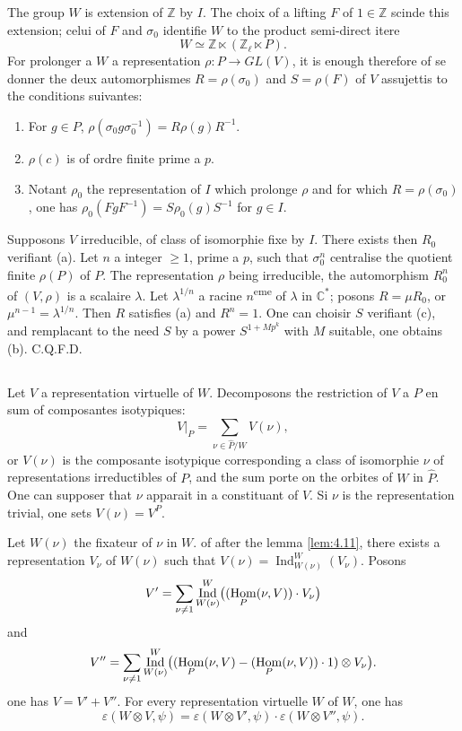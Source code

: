 \documentclass[12pt,a4paper]{article}
\theoremstyle{plain}
\theoremstyle{definition}
\theoremstyle{remark}
\DeclareMathOperator{\Ind}{Ind}
\DeclareMathOperator{\Hom}{Hom}
\newcommand{\bZ}{\mathbb{Z}}
\newcommand{\bC}{\mathbb{C}}
\let\dim\relax\let\det\relax
\providecommand{\Hom}{\operatorname{Hom}}
\begin{document}
The group $W$ is extension of $\bZ$ by $I$. The choix of a lifting $F$ of $1 \in \bZ$ scinde this extension; celui of $F$ and $\sigma_0$ identifie $W$ to the product semi-direct itere
\[
W \simeq \bZ \ltimes (\bZ_\ell \ltimes P).
\]
For prolonger a $W$ a representation $\rho: P \to GL(V)$, it is enough therefore of se donner the deux automorphismes $R = \rho(\sigma_0)$ and $S = \rho(F)$ of $V$ assujettis to the conditions suivantes:
\begin{enumerate}[label=(\alph*)]
\item For $g \in P$, $\rho(\sigma_0 g \sigma_0^{-1}) = R \rho(g) R^{-1}$.
\item $\rho(c)$ is of ordre finite prime a $p$.
\item Notant $\rho_0$ the representation of $I$ which prolonge $\rho$ and for which $R = \rho(\sigma_0)$, one has $\rho_0(F g F^{-1}) = S \rho_0(g) S^{-1}$ for $g \in I$.
\end{enumerate}

Supposons $V$ irreducible, of class of isomorphie fixe by $I$. There exists then $R_0$ verifiant (a). Let $n$ a integer $\geq 1$, prime a $p$, such that $\sigma_0^n$ centralise the quotient finite $\rho(P)$ of $P$. The representation $\rho$ being irreducible, the automorphism $R_0^n$ of $(V, \rho)$ is a scalaire $\lambda$. Let $\lambda^{1/n}$ a racine $n$\textsuperscript{eme} of $\lambda$ in $\bC^*$; posons $R = \mu R_0$, or $\mu^{n-1} = \lambda^{1/n}$. Then $R$ satisfies (a) and $R^n = 1$. One can choisir $S$ verifiant (c), and remplacant to the need $S$ by a power $S^{1 + Mp^k}$ with $M$ suitable, one obtains (b). C.Q.F.D.


\subsection{}
\label{sec:4.13}

Let $V$ a representation virtuelle of $W$. Decomposons the restriction of $V$ a $P$ en sum of composantes isotypiques:
\[
V|_P = \sum_{\nu \in \hat{P}/W} V(\nu),
\]
or $V(\nu)$ is the composante isotypique corresponding a class of isomorphie $\nu$ of representations irreductibles of $P$, and the sum porte on the orbites of $W$ in $\hat{P}$. One can supposer that $\nu$ apparait in a constituant of $V$. Si $\nu$ is the representation trivial, one sets $V(\nu) = V^P$.

Let $W(\nu)$ the fixateur of $\nu$ in $W$. of after the lemma \ref{lem:4.11}, there exists a representation $V_\nu$ of $W(\nu)$ such that $V(\nu) = \Ind_{W(\nu)}^W(V_\nu)$. Posons
\[
V' = \sum_{\nu \neq 1} \Ind_{W(\nu)}^W\bigl((\dim \Hom_P(\nu, V)) \cdot V_\nu\bigr)
\]
and
\[
V'' = \sum_{\nu \neq 1} \Ind_{W(\nu)}^W\bigl((\Hom_P(\nu, V) - (\dim \Hom_P(\nu, V)) \cdot 1) \otimes V_\nu\bigr).
\]
one has $V = V' + V''$. For every representation virtuelle $W$ of $W$, one has
\[
\varepsilon(W \otimes V, \psi) = \varepsilon(W \otimes V', \psi) \cdot \varepsilon(W \otimes V'', \psi).
\]
\end{document}
